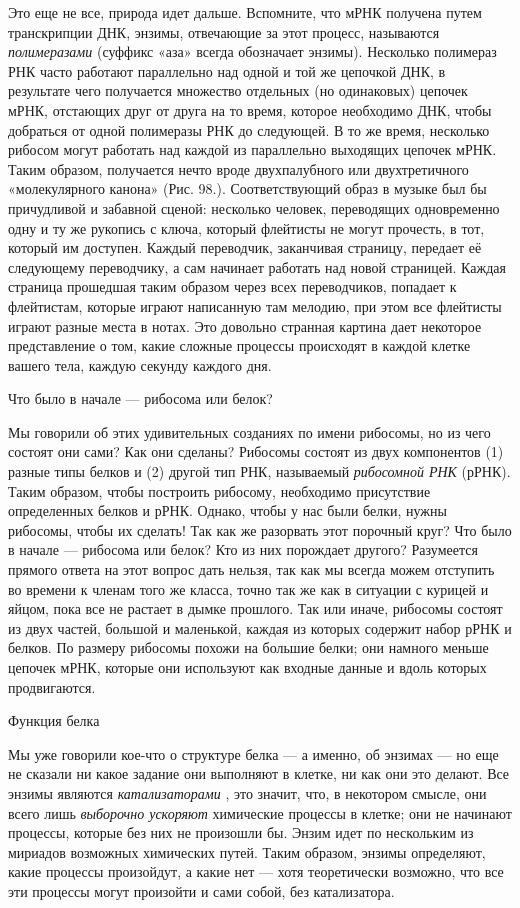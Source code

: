 \documentclass[../main.tex]{subfiles}
\begin{document}
Это еще не все, природа идет дальше. Вспомните, что мРНК получена путем транскрипции ДНК, энзимы, отвечающие за этот процесс, называются \emph{полимеразами} (суффикс «аза» всегда обозначает энзимы). Несколько полимераз РНК часто работают параллельно над одной и той же цепочкой ДНК, в результате чего получается множество отдельных (но одинаковых) цепочек мРНК, отстающих друг от друга на то время, которое необходимо ДНК, чтобы добраться от одной полимеразы РНК до следующей. В то же время, несколько рибосом могут работать над каждой из параллельно выходящих цепочек мРНК\@. Таким образом, получается нечто вроде двухпалубного или двухтретичного «молекулярного канона» (Рис. 98.). Соответствующий образ в музыке был бы причудливой и забавной сценой: несколько человек, переводящих одновременно одну и ту же рукопись с ключа, который флейтисты не могут прочесть, в тот, который им доступен. Каждый переводчик, заканчивая страницу, передает её следующему переводчику, а сам начинает работать над новой страницей. Каждая страница прошедшая таким образом через всех переводчиков, попадает к флейтистам, которые играют написанную там мелодию, при этом все флейтисты играют разные места в нотах. Это довольно странная картина дает некоторое представление о том, какие сложные процессы происходят в каждой клетке вашего тела, каждую секунду каждого дня.

Что было в начале --- рибосома или белок?

Мы говорили об этих удивительных созданиях по имени рибосомы, но из чего состоят они сами? Как они сделаны? Рибосомы состоят из двух компонентов (1) разные типы белков и (2) другой тип РНК, называемый \emph{рибосомной РНК} (рРНК). Таким образом, чтобы построить рибосому, необходимо присутствие определенных белков и рРНК\@. Однако, чтобы у нас были белки, нужны рибосомы, чтобы их сделать! Так как же разорвать этот порочный круг? Что было в начале --- рибосома или белок? Кто из них порождает другого? Разумеется прямого ответа на этот вопрос дать нельзя, так как мы всегда можем отступить во времени к членам того же класса, точно так же как в ситуации с курицей и яйцом, пока все не растает в дымке прошлого. Так или иначе, рибосомы состоят из двух частей, большой и маленькой, каждая из которых содержит набор рРНК и белков. По размеру рибосомы похожи на большие белки; они намного меньше цепочек мРНК, которые они используют как входные данные и вдоль которых продвигаются.

Функция белка

Мы уже говорили кое-что о структуре белка --- а именно, об энзимах --- но еще не сказали ни какое задание они выполняют в клетке, ни как они это делают. Все энзимы являются \emph{катализаторами} , это значит, что, в некотором смысле, они всего лишь \emph{выборочно ускоряют} химические процессы в клетке; они не начинают процессы, которые без них не произошли бы. Энзим идет по нескольким из мириадов возможных химических путей. Таким образом, энзимы определяют, какие процессы произойдут, а какие нет --- хотя теоретически возможно, что все эти процессы могут произойти и сами собой, без катализатора.
\end{document}
